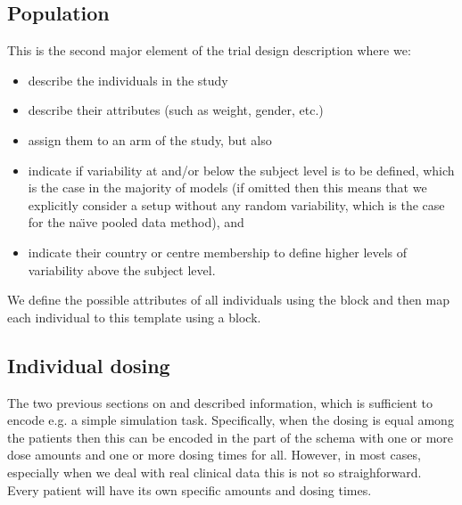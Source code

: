 \subsection{Population}
\label{subsec:TrialPopulation}

This is the second major element of the trial design description where we:
\begin{itemize}
\item
describe the individuals in the study
\item
describe their attributes (such as weight, gender, etc.)
\item
assign them to an arm of the study, but also
\item
indicate if variability at and/or below the subject level is to be defined, which is the case in the majority of models (if omitted
then this means that we explicitly consider a setup without any random variability,
which is the case for the na\"{\i}ve pooled data method), and
\item
indicate their country or centre membership to define higher levels of variability above the subject level.
\end{itemize}
We define the possible attributes of all individuals using the  block and then map
each individual to this template using a  block.

%
%
%

\subsection{Individual dosing}
\label{subsec:TrialSIndivDosing}

The two previous sections on  and  described information,
which is sufficient to encode e.g. a simple simulation task. Specifically, when the dosing is 
equal among the patients then this can be encoded in the  part of the schema with
one or more dose amounts and one or more dosing times for all. However, in most cases, especially
when we deal with real clinical data this is not so straighforward. Every patient will have its own specific 
amounts and dosing times.

